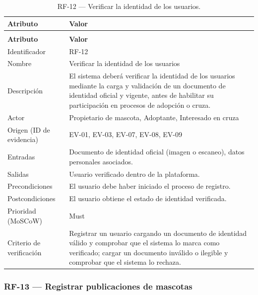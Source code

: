 \documentclass[journal,onecolumn]{IEEEtran}
\makeatletter
\newenvironment{atributos}[2]{%
	\small
	\begin{longtable}{@{}>{\raggedright\arraybackslash}p{4.2cm} >{\raggedright\arraybackslash}p{11.2cm}@{}}
		\caption{#2}\label{tab:#1}\\
		\toprule
		\textbf{Atributo} & \textbf{Valor} \\
		\midrule
		\endfirsthead
		\multicolumn{2}{@{}l}{\small\itshape (continuación)}\\
		\toprule
		\textbf{Atributo} & \textbf{Valor} \\
		\midrule
		\endhead
		\bottomrule
		\endlastfoot
	}{%
	\end{longtable}
	\normalsize
}
\makeatother
\begin{document}
	\begin{atributos}{RF-12}{RF-12 --- Verificar la identidad de los usuarios.}
		Identificador & RF-12 \\
		Nombre & Verificar la identidad de los usuarios \\
		Descripción & El sistema deberá verificar la identidad de los usuarios mediante la carga y validación de un documento de identidad oficial y vigente, antes de habilitar su participación en procesos de adopción o cruza. \\
		Actor & Propietario de mascota, Adoptante, Interesado en cruza \\
		Origen (ID de evidencia) & EV-01, EV-03, EV-07, EV-08, EV-09 \\
		Entradas & Documento de identidad oficial (imagen o escaneo), datos personales asociados. \\
		Salidas & Usuario verificado dentro de la plataforma. \\
		Precondiciones & El usuario debe haber iniciado el proceso de registro. \\
		Postcondiciones & El usuario obtiene el estado de identidad verificada. \\
		Prioridad (MoSCoW) & Must \\
		Criterio de verificación & Registrar un usuario cargando un documento de identidad válido y comprobar que el sistema lo marca como verificado; cargar un documento inválido o ilegible y comprobar que el sistema lo rechaza. \\
	\end{atributos}
	
	\subsubsection{RF-13 --- Registrar publicaciones de mascotas}
	
\end{document}
